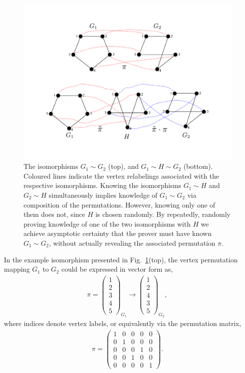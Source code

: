 \begin{figure}[!htpb]
	\includegraphics[width=\columnwidth]{figures/ZKP_graph_isomorphism}
    \caption{The isomorphisms \mbox{$G_1\sim G_2$} (top), and \mbox{$G_1\sim H\sim G_2$} (bottom). Coloured lines indicate the vertex relabelings associated with the respective isomorphisms. Knowing the isomorphisms \mbox{$G_1\sim H$} and \mbox{$G_2\sim H$} simultaneously implies knowledge of \mbox{$G_1\sim G_2$} via composition of the permutations. However, knowing only one of them does not, since $H$ is chosen randomly. By repeatedly, randomly proving knowledge of one of the two isomorphisms with $H$ we achieve asymptotic certainty that the prover must have known \mbox{$G_1\sim G_2$}, without actually revealing the associated permutation $\pi$.}\label{fig:ZKP_graph}
\end{figure}

In the example isomorphism presented in Fig.~\ref{fig:ZKP_graph}(top), the vertex permutation mapping $G_1$ to $G_2$ could be expressed in vector form as,
\begin{align}
\pi = \begin{pmatrix}
	1 \\
	2 \\
	3 \\
	4 \\
	5
\end{pmatrix}_{G_1} \to \begin{pmatrix}
	1 \\
	2 \\
	4 \\
	3 \\
	5
\end{pmatrix}_{G_2},
\end{align}
where indices denote vertex labels, or equivalently via the permutation matrix,
\begin{align}
\pi = \begin{pmatrix}
	1 & 0 & 0 & 0 & 0 \\
	0 & 1 & 0 & 0 & 0 \\
	0 & 0 & 0 & 1 & 0 \\
	0 & 0 & 1 & 0 & 0 \\
	0 & 0 & 0 & 0 & 1
\end{pmatrix}.
\end{align}

